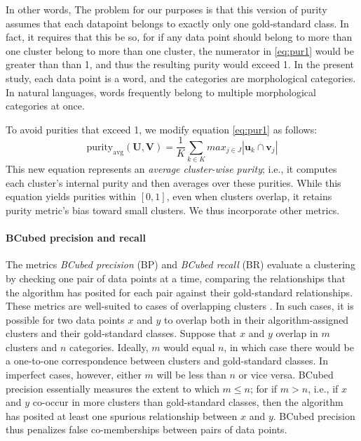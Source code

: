 {\begin{equation}
\end{equation}
In other words, 
The problem for our purposes is that this version of purity assumes that each datapoint belongs to exactly only one gold-standard class. In fact, it requires that this be so, for if any data point should belong to more than one cluster belong to more than one cluster, the numerator in \eqref{eq:pur1} would be greater than than 1, and thus the resulting purity would exceed 1.
In the present study, each data point is a word, and the categories are morphological categories. In natural languages, words frequently belong to multiple morphological categories at once.

To avoid purities that exceed 1, we modify equation \eqref{eq:pur1} as follows: 
\begin{equation} \label{eq:pur2}
\text{purity}_{\text{avg}}(\mathbf{U}, \mathbf{V}) =  \frac{1}{K} \sum_{k \in K} max_{j \in J} |\mathbf{u}_k \cap \mathbf{v}_j|
\end{equation}
This new equation represents an \emph{average cluster-wise purity}; i.e., it computes each cluster's internal purity and then averages over these purities. %
While this equation yields purities within $[0, 1]$, even 
when clusters overlap, it retains %
purity metric's bias toward small clusters. We thus incorporate other metrics. 

\paragraph{BCubed precision and recall}
The metrics \emph{BCubed precision} (BP) and \emph{BCubed recall} (BR) \citep{bagga-and-baldwin:1998} evaluate a clustering by checking one 
pair of data points at a time, comparing the relationships that the algorithm has posited for each pair against their 
gold-standard relationships. These metrics are well-suited to cases of overlapping 
clusters \citep{amigo-et-al:2009}. 
In such cases, it is possible for two data points $x$ and $y$ to overlap both in their algorithm-assigned clusters and their 
gold-standard classes. Suppose that $x$ and $y$ overlap in $m$ clusters and $n$ categories. Ideally, $m$ would 
equal $n$, in which case there would be a one-to-one correspondence between clusters and gold-standard classes. 
In imperfect cases, however, either $m$ will be less than $n$ or vice versa. BCubed precision essentially 
measures the extent to which $m \leq n$; for if $m>n$, i.e., if $x$ and $y$ co-occur in more clusters than gold-standard classes, then the algorithm has posited at least one 
spurious relationship between $x$ and $y$. BCubed precision thus penalizes false co-memberships between pairs of data points.

}
